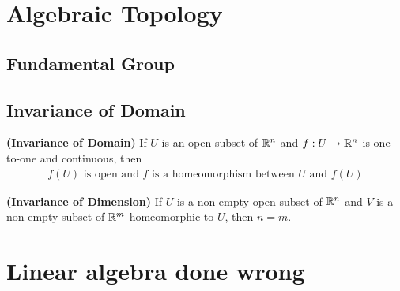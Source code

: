 \documentclass{report}
\begin{document}
\chapter{Algebraic Topology}
\section{Fundamental Group}
\section{Invariance of Domain}
\begin{theorem}
\textbf{(Invariance of Domain)} If $U$ is an open subset of $\mathbb{R}^n$ and  $f:U\rightarrow \mathbb{R}^n$ is one-to-one and continuous, then 
\begin{align*}
f(U)\text{ is open and }f\text{ is a homeomorphism between }U\text{ and }f(U)
\end{align*}
\end{theorem}
\begin{theorem}
\textbf{(Invariance of Dimension)} If $U$ is a non-empty open subset of $\mathbb{R}^n$ and  $V$ is a non-empty subset of $\mathbb{R}^m$ homeomorphic to  $U$, then  $n=m$.
\end{theorem}
\chapter{Linear algebra done wrong}
\end{document}

